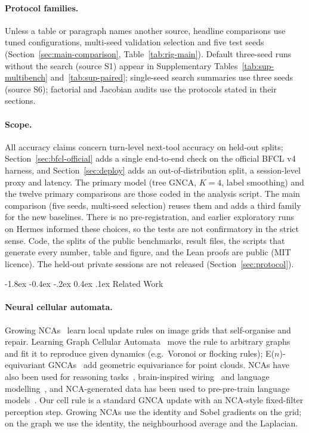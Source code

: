\documentclass[10pt,twocolumn,letterpaper]{article}
\makeatletter
\renewcommand\section{\@startsection {section}{1}{\z@}%
  {-1.8ex \@plus -0.4ex \@minus -.2ex}%
  {0.4ex \@plus.1ex}%
  {\normalfont\normalsize\bfseries}}
\makeatother
\begin{document}
\paragraph{Protocol families.} Unless a table or paragraph names another source, headline comparisons use tuned configurations, multi-seed validation selection and five test seeds (Section~\ref{sec:main-comparison}, Table~\ref{tab:rig-main}). Default three-seed runs without the search (source S1) appear in Supplementary Tables~\ref{tab:sup-multibench} and~\ref{tab:sup-paired}; single-seed search summaries use three seeds (source S6); factorial and Jacobian audits use the protocols stated in their sections.
\paragraph{Scope.} All accuracy claims concern turn-level next-tool accuracy on held-out splits; Section~\ref{sec:bfcl-official} adds a single end-to-end check on the official BFCL v4 harness, and Section~\ref{sec:deploy} adds an out-of-distribution split, a session-level proxy and latency. The primary model (tree GNCA, $K{=}4$, label smoothing) and the twelve primary comparisons are those coded in the analysis script. The main comparison (five seeds, multi-seed selection) reuses them and adds a third family for the new baselines. There is no pre-registration, and earlier exploratory runs on Hermes informed these choices, so the tests are not confirmatory in the strict sense. Code, the splits of the public benchmarks, result files, the scripts that generate every number, table and figure, and the Lean proofs are public (MIT licence). The held-out private sessions are not released (Section~\ref{sec:protocol}).

\section{Related Work}\label{sec:related-work}
\paragraph{Neural cellular automata.} Growing NCAs~\cite{mordvintsev2020growing} learn local update rules on image grids that self-organise and repair. Learning Graph Cellular Automata~\cite{grattarola2021learning} move the rule to arbitrary graphs and fit it to reproduce given dynamics (e.g.\ Voronoi or flocking rules); E($n$)-equivariant GNCAs~\cite{gala2023equivariant} add geometric equivariance for point clouds. NCAs have also been used for reasoning tasks~\cite{etcheverry2026reasoning}, brain-inspired wiring~\cite{pio2026brainca} and language modelling~\cite{mittal2026textnca}, and NCA-generated data has been used to pre-pre-train language models~\cite{lee2026training}. Our cell rule is a standard GNCA update with an NCA-style fixed-filter perception step. Growing NCAs use the identity and Sobel gradients on the grid; on the graph we use the identity, the neighbourhood average and the Laplacian.
\end{document}
